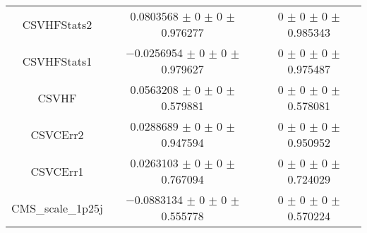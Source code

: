 \begin{table}
\begin{tabular}{ccc}
CSVHFStats2 	& \num{0.0803568} $\pm$ \num{0} $\pm$ \num{0} $\pm$ \num{0.976277} 	& \num{0} $\pm$ \num{0} $\pm$ \num{0} $\pm$ \num{0.985343}\\
CSVHFStats1 	& \num{-0.0256954} $\pm$ \num{0} $\pm$ \num{0} $\pm$ \num{0.979627} 	& \num{0} $\pm$ \num{0} $\pm$ \num{0} $\pm$ \num{0.975487}\\
CSVHF 	& \num{0.0563208} $\pm$ \num{0} $\pm$ \num{0} $\pm$ \num{0.579881} 	& \num{0} $\pm$ \num{0} $\pm$ \num{0} $\pm$ \num{0.578081}\\
CSVCErr2 	& \num{0.0288689} $\pm$ \num{0} $\pm$ \num{0} $\pm$ \num{0.947594} 	& \num{0} $\pm$ \num{0} $\pm$ \num{0} $\pm$ \num{0.950952}\\
CSVCErr1 	& \num{0.0263103} $\pm$ \num{0} $\pm$ \num{0} $\pm$ \num{0.767094} 	& \num{0} $\pm$ \num{0} $\pm$ \num{0} $\pm$ \num{0.724029}\\
CMS\_scale\_1p25j 	& \num{-0.0883134} $\pm$ \num{0} $\pm$ \num{0} $\pm$ \num{0.555778} 	& \num{0} $\pm$ \num{0} $\pm$ \num{0} $\pm$ \num{0.570224}\\
\bottomrule
\end{tabular}
\end{table}